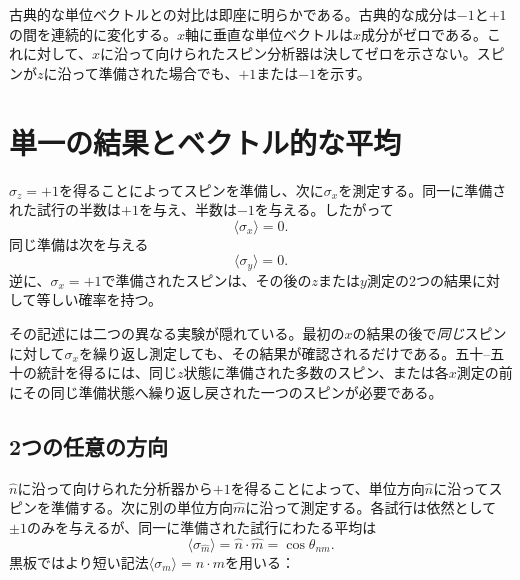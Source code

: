 古典的な単位ベクトルとの対比は即座に明らかである。古典的な成分は\(-1\)と\(+1\)の間を連続的に変化する。\(x\)軸に垂直な単位ベクトルは\(x\)成分がゼロである。これに対して、\(x\)に沿って向けられたスピン分析器は決してゼロを示さない。スピンが\(z\)に沿って準備された場合でも、\(+1\)または\(-1\)を示す。

\section{単一の結果とベクトル的な平均}

\(\sigma_z=+1\)を得ることによってスピンを準備し、次に\(\sigma_x\)を測定する。同一に準備された試行の半数は\(+1\)を与え、半数は\(-1\)を与える。したがって
\begin{equation}
\langle \sigma_x\rangle=0.
\end{equation}
同じ準備は次を与える
\begin{equation}
\langle \sigma_y\rangle=0.
\end{equation}
逆に、\(\sigma_x=+1\)で準備されたスピンは、その後の\(z\)または\(y\)測定の2つの結果に対して等しい確率を持つ。

その記述には二つの異なる実験が隠れている。最初の\(x\)の結果の後で\emph{同じ}スピンに対して\(\sigma_x\)を繰り返し測定しても、その結果が確認されるだけである。五十--五十の統計を得るには、同じ\(z\)状態に準備された多数のスピン、または各\(x\)測定の前にその同じ準備状態へ繰り返し戻された一つのスピンが必要である。

\begin{classroomqa}
\end{classroomqa}

\subsection{2つの任意の方向}

\(\hat n\)に沿って向けられた分析器から\(+1\)を得ることによって、単位方向\(\hat n\)に沿ってスピンを準備する。次に別の単位方向\(\hat m\)に沿って測定する。各試行は依然として\(\pm1\)のみを与えるが、同一に準備された試行にわたる平均は
\begin{equation}
\boxed{\langle\sigma_{\hat m}\rangle=\hat n\cdot\hat m
=\cos\theta_{nm}.}
\label{eq:spin-average}
\end{equation}
黒板ではより短い記法\(\langle\sigma_m\rangle=n\cdot m\)を用いる：

